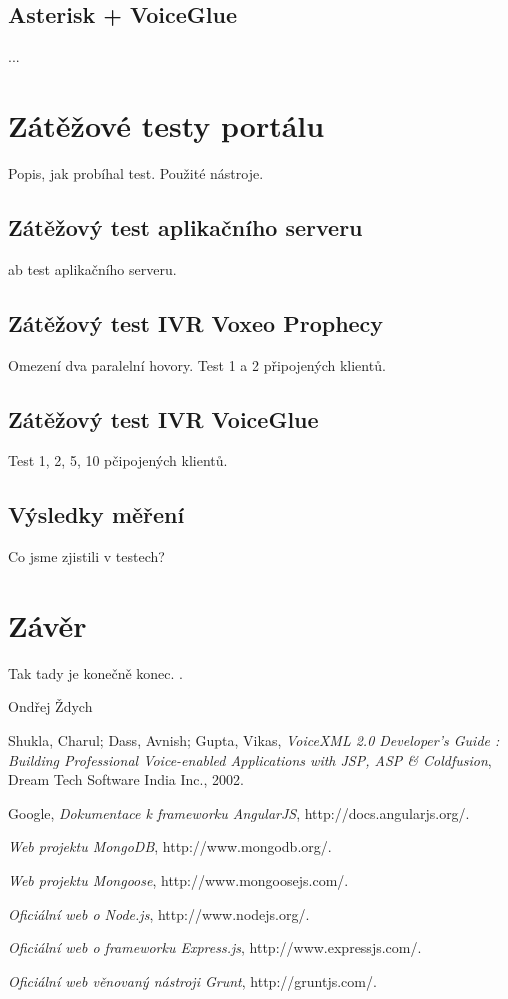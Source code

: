 \documentclass[ing,male,java,dept460]{diploma}						%
\begin{document}
\subsection{Asterisk + VoiceGlue}
...

\section{Zátěžové testy portálu}
\label{sec:Benchmark}
Popis, jak probíhal test. Použité nástroje.

\subsection{Zátěžový test aplikačního serveru}
ab test aplikačního serveru.

\subsection{Zátěžový test IVR Voxeo Prophecy}
Omezení dva paralelní hovory. Test 1 a 2 připojených klientů.

\subsection{Zátěžový test IVR VoiceGlue}
Test 1, 2, 5, 10 pčipojených klientů.

\subsection{Výsledky měření}
Co jsme zjistili v testech?

\section{Závěr}
\label{sec:Conclusion}
Tak tady je konečně konec.
\cite{goossens94,lamport94}.

\bigskip
\begin{flushright}
Ondřej Ždych
\end{flushright}

\begin{thebibliography}{99}

 Shukla, Charul; Dass, Avnish; Gupta, Vikas,
\textit{VoiceXML 2.0 Developer's Guide : Building Professional Voice-enabled Applications with JSP, ASP & Coldfusion}, Dream Tech Software India Inc., 2002.

 Google,
\textit{Dokumentace k frameworku AngularJS}, http://docs.angularjs.org/.

\textit{Web projektu MongoDB}, http://www.mongodb.org/.

\textit{Web projektu Mongoose}, http://www.mongoosejs.com/.

\textit{Oficiální web o Node.js}, http://www.nodejs.org/.

\textit{Oficiální web o frameworku Express.js}, http://www.expressjs.com/.

\textit{Oficiální web věnovaný nástroji Grunt}, http://gruntjs.com/.

\end{thebibliography}
\end{document}
